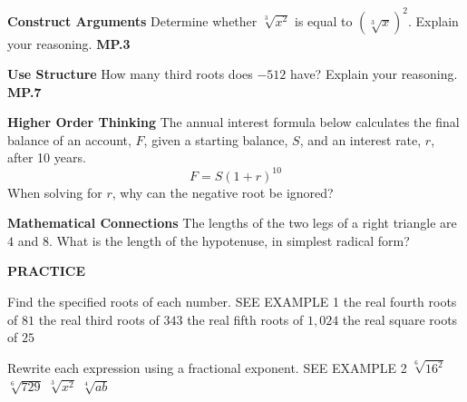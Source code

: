 \documentclass{article}
\newenvironment{practice}[2]{}{}
\begin{document}
\begin{practice}{21}{}
\textbf{Construct Arguments} Determine whether $\sqrt[3]{x^2}$ is equal to $(\sqrt[3]{x})^2$. Explain your reasoning. \textbf{MP.3}
\end{practice}

\begin{practice}{22}{}
\textbf{Use Structure} How many third roots does $-512$ have? Explain your reasoning. \textbf{MP.7}
\end{practice}

\begin{practice}{23}{}
\textbf{Higher Order Thinking} The annual interest formula below calculates the final balance of an account, $F$, given a starting balance, $S$, and an interest rate, $r$, after 10 years.
\[ F = S(1 + r)^{10} \]
When solving for $r$, why can the negative root be ignored?
\end{practice}

\begin{practice}{24}{}
\textbf{Mathematical Connections} The lengths of the two legs of a right triangle are $4$ and $8$. What is the length of the hypotenuse, in simplest radical form?
\end{practice}

\textbf{PRACTICE}

Find the specified roots of each number. SEE EXAMPLE 1
\begin{practice}{25}{}
the real fourth roots of $81$
\end{practice}
\begin{practice}{26}{}
the real third roots of $343$
\end{practice}
\begin{practice}{27}{}
the real fifth roots of $1,024$
\end{practice}
\begin{practice}{28}{}
the real square roots of $25$
\end{practice}

Rewrite each expression using a fractional exponent. SEE EXAMPLE 2
\begin{practice}{29}{}
$\sqrt[6]{16^2}$
\end{practice}
\begin{practice}{30}{}
$\sqrt[6]{729}$
\end{practice}
\begin{practice}{31}{}
$\sqrt[3]{x^2}$
\end{practice}
\begin{practice}{32}{}
$\sqrt[4]{ab}$
\end{practice}
\end{document}

